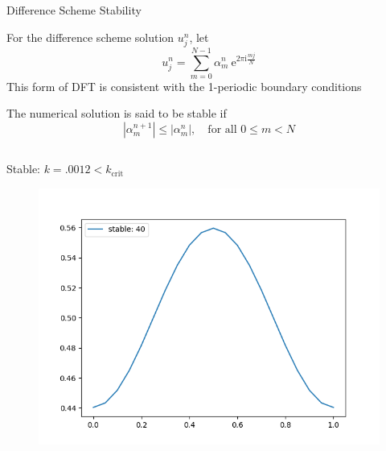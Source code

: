 \documentclass[professionalfont]{beamer}
\theoremstyle{remark}
\newcommand{\e}{\mathrm{e}}
\renewcommand{\i}{\mathrm{i}}
\begin{document}
\begin{frame}{Difference Scheme Stability}

	For the difference scheme solution $u_j^n$, let 
	\begin{equation*}
		u_j^n=\sum_{m=0}^{N-1}\alpha_m^n~\e^{2\pi\i \frac{mj}{N}}
	\end{equation*}
	This form of DFT is consistent with the 1-periodic boundary conditions

	\vspace{10 pt}

	The numerical solution is said to be stable if 
	\begin{equation*}
		|\alpha_m^{n+1}|\le|\alpha_m^n|,\quad\text{for all }0\le m< N
	\end{equation*}

	\vspace{10 pt}
	\begin{columns} %
		
		\begin{column}{.45\paperwidth}
			\centering
			\small
			Stable: $k=.0012<k_\text{crit}$
			\vspace{-10 pt}
			\begin{figure}
				\centering
				\includegraphics[width = .3\paperwidth]{media/stable.png}	
			\end{figure}	
		\end{column}


\end{columns}
\end{frame}
\end{document}
